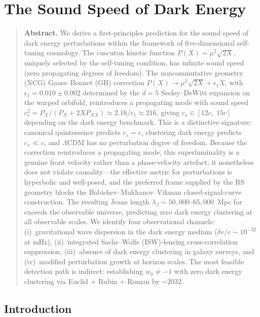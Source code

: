 \chapter{The Sound Speed of Dark Energy}
\label{ch:sound-speed}

\begin{quote}
\textbf{Abstract.}
We derive a first-principles prediction for the sound speed of dark energy perturbations within the framework of five-dimensional self-tuning cosmology. The cuscuton kinetic function $P(X) = \mu^2 \sqrt{2X}$, uniquely selected by the self-tuning condition, has infinite sound speed (zero propagating degrees of freedom). The noncommutative geometry (NCG) Gauss--Bonnet (GB) correction $P(X) \to \mu^2 \sqrt{2X} + \epsilon_1 X$, with $\epsilon_1 = 0.010 \pm 0.002$ determined by the $d = 5$ Seeley--DeWitt expansion on the warped orbifold, reintroduces a propagating mode with sound speed $c_s^2 = P_X / (P_X + 2X P_{XX}) \approx 2.16/\epsilon_1 \approx 216$, giving $c_s \in [12c,\; 15c]$ depending on the dark energy benchmark. This is a distinctive signature: canonical quintessence predicts $c_s = c$, clustering dark energy predicts $c_s \ll c$, and $\Lambda$CDM has no perturbation degree of freedom. Because the correction reintroduces a propagating mode, this superluminality is a genuine front velocity rather than a phase-velocity artefact; it nonetheless does not violate causality---the effective metric for perturbations is hyperbolic and well-posed, and the preferred frame supplied by the RS geometry blocks the Babichev--Mukhanov--Vikman closed-signal-curve construction. The resulting Jeans length $\lambda_J \sim 50{,}000$--$65{,}000$~Mpc far exceeds the observable universe, predicting zero dark energy clustering at all observable scales. We identify four observational channels: (i)~gravitational wave dispersion in the dark energy medium ($\delta v/c \sim 10^{-32}$ at mHz), (ii)~integrated Sachs--Wolfe (ISW)-lensing cross-correlation suppression, (iii)~absence of dark energy clustering in galaxy surveys, and (iv)~modified perturbation growth at horizon scales. The most feasible detection path is indirect: establishing $w_0 \neq -1$ with zero dark energy clustering via Euclid + Rubin + Roman by ${\sim}2032$.
\end{quote}

\section{Introduction}
\label{sec:5-introduction}

